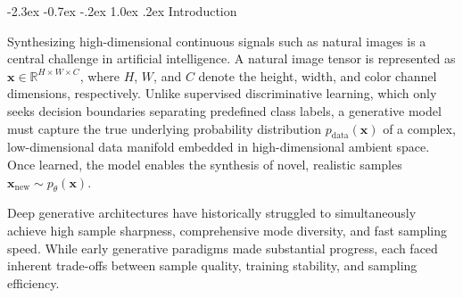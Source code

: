 \documentclass[10pt,a4paper]{article}
\makeatletter
\renewcommand\section{\@startsection {section}{1}{\z@}%
                                   {-2.3ex \@plus -0.7ex \@minus -.2ex}%
                                   {1.0ex \@plus.2ex}%
                                   {\normalfont\large\bfseries}}
\makeatother
\begin{document}
\section{Introduction}

Synthesizing high-dimensional continuous signals such as natural images is a central challenge in artificial intelligence. A natural image tensor is represented as $\mathbf{x} \in \mathbb{R}^{H \times W \times C}$, where $H$, $W$, and $C$ denote the height, width, and color channel dimensions, respectively. Unlike supervised discriminative learning, which only seeks decision boundaries separating predefined class labels, a generative model must capture the true underlying probability distribution $p_{\text{data}}(\mathbf{x})$ of a complex, low-dimensional data manifold embedded in high-dimensional ambient space. Once learned, the model enables the synthesis of novel, realistic samples $\mathbf{x}_{\text{new}} \sim p_\theta(\mathbf{x})$.

Deep generative architectures have historically struggled to simultaneously achieve high sample sharpness, comprehensive mode diversity, and fast sampling speed. While early generative paradigms made substantial progress, each faced inherent trade-offs between sample quality, training stability, and sampling efficiency.
\end{document}
